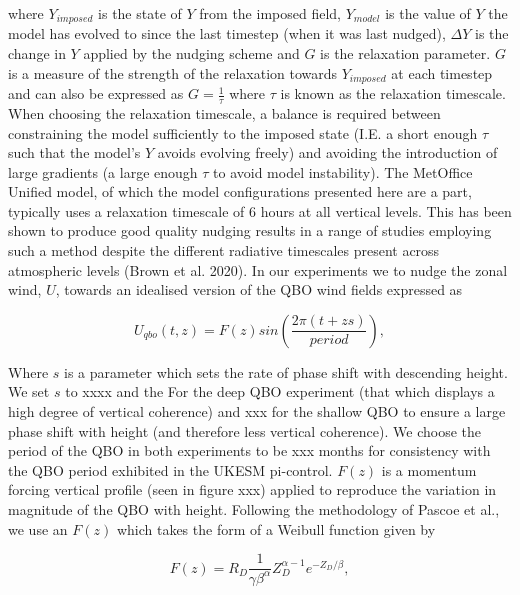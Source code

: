 where $Y_{imposed}$ is the state of $Y$ from the imposed field, $Y_{model}$ is the value of $Y$ the model has evolved to since the last timestep (when it was last nudged), $\Delta Y$ is the change in $Y$ applied by the nudging scheme and $G$ is the relaxation parameter. $G$ is a measure of the strength of the relaxation towards $Y_{imposed}$ at each timestep and can also be expressed as $G = \frac{1}{\tau}$ where $\tau$ is known as the relaxation timescale. When choosing the relaxation timescale, a balance is required between constraining the model sufficiently to the imposed state (I.E. a short enough $\tau$ such that the model's $Y$ avoids evolving freely) and avoiding the introduction of large gradients (a large enough $\tau$ to avoid model instability). The MetOffice Unified model, of which the model configurations presented here are a part, typically uses a relaxation timescale of 6 hours at all vertical levels. This has been shown to produce good quality nudging results in a range of studies employing such a method despite the different radiative timescales present across atmospheric levels (Brown et al. 2020). In our experiments we to nudge the zonal wind, $U$, towards an idealised version of the QBO wind fields expressed as 

\begin{equation} \label{eq:imposed_U}
U_{qbo}(t, z) = F(z) sin(\frac{2\pi (t + zs)}{period}),
\end{equation}

Where $s$ is a parameter which sets the rate of phase shift with descending height. We set $s$ to xxxx and the For the deep QBO experiment (that which displays a high degree of vertical coherence) and xxx for the shallow QBO to ensure a large phase shift with height (and therefore less vertical coherence). We choose the period of the QBO in both experiments to be xxx months for consistency with the QBO period exhibited in the UKESM pi-control. $F(z)$ is a momentum forcing vertical profile (seen in figure xxx) applied to reproduce the variation in magnitude of the QBO with height. Following the methodology of Pascoe et al., we use an $F(z)$ which takes the form of a Weibull function given by

\begin{equation} \label{eq:vertical_profile}
F(z) = R_D \frac{1}{\gamma \beta^\alpha}  Z_D^{\alpha-1}  e^{-Z_D/\beta},
\end{equation}

